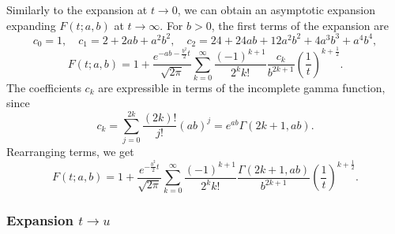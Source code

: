 \documentclass[10pt,a4paper,oneside]{article}
\numberwithin{equation}{section}
\begin{document}
Similarly to the expansion at $t \to 0$, we can obtain an asymptotic expansion expanding $F(t; a, b)$ at $t \to \infty$. For $b > 0$, the first terms of the expansion are
\begin{equation}
c_0 = 1, \quad c_1 = 2 + 2ab + a^2 b^2, \quad c_2 = 24 + 24ab + 12a^2b^2 + 4a^3b^3 + a^4b^4,
\end{equation}
\begin{equation}
F(t; a, b) = 1 + \frac{e^{-ab - \frac{b^2}{2}t}}{\sqrt{2\pi}}\sum_{k=0}^{\infty}\frac{(-1)^{k+1}}{2^k k!}\frac{c_k}{b^{2k+1}}\left(\frac{1}{t}\right)^{k+\frac{1}{2}}.
\end{equation}
The coefficients $c_k$ are expressible in terms of the incomplete gamma function, since
\begin{equation*}
c_k = \sum_{j=0}^{2k}\frac{(2k)!}{j!}(ab)^j = e^{ab}\Gamma(2k+1, ab).
\end{equation*}
Rearranging terms, we get
\begin{equation}\label{phi_expansion_at_inf}
F(t; a, b) = 1 + \frac{e^{- \frac{b^2}{2}t}}{\sqrt{2\pi}}\sum_{k=0}^{\infty}\frac{(-1)^{k+1}}{2^k k!}\frac{\Gamma(2k+1, ab)}{b^{2k+1}}\left(\frac{1}{t}\right)^{k+\frac{1}{2}}.
\end{equation}

\subsubsection{Expansion $t \to u$}
\end{document}
